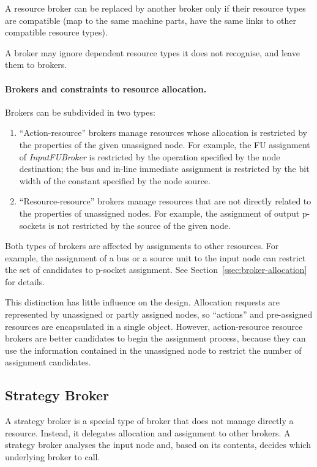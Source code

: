 \documentclass[a4paper,twoside]{tce}
\begin{document}
A resource broker can be replaced by another broker only if their resource
types are compatible (map to the same machine parts, have the same links to
other compatible resource types).

A broker may ignore dependent resource types it does not recognise, and
leave them to brokers.

\paragraph{Brokers and constraints to resource allocation.}

Brokers can be subdivided in two types:
\begin{enumerate}
\item %
  ``Action-resource'' brokers manage resources whose allocation is
  restricted by the properties of the given unassigned node. For example,
  the FU assignment of \emph{InputFUBroker} is restricted by the operation
  specified by the node destination; the bus and in-line immediate
  assignment is restricted by the bit width of the
  constant specified by the node source.
\item %
  ``Resource-resource'' brokers manage resources that are not directly
  related to the properties of unassigned nodes. For example, the assignment
  of output p-sockets is not restricted by the source of the given node.
\end{enumerate}

Both types of brokers are affected by assignments to other resources. For
example, the assignment of a bus or a source unit to the input node can
restrict the set of candidates to p-socket assignment. See
Section~\ref{ssec:broker-allocation} for details.

This distinction has little influence on the design. Allocation requests are
represented by unassigned or partly assigned nodes, so ``actions'' and
pre-assigned resources are encapsulated in a single object.
However, action-resource resource brokers are better candidates to begin the
assignment process, because they can use the information contained in the
unassigned node to restrict the number of assignment candidates.

\subsection{Strategy Broker}
\label{ssec:strategy-broker}

A strategy broker is a special type of broker that does not manage directly
a resource. Instead, it delegates allocation and assignment to other
brokers. A strategy broker analyses the input node and, based on its
contents, decides which underlying broker to call.
\end{document}
